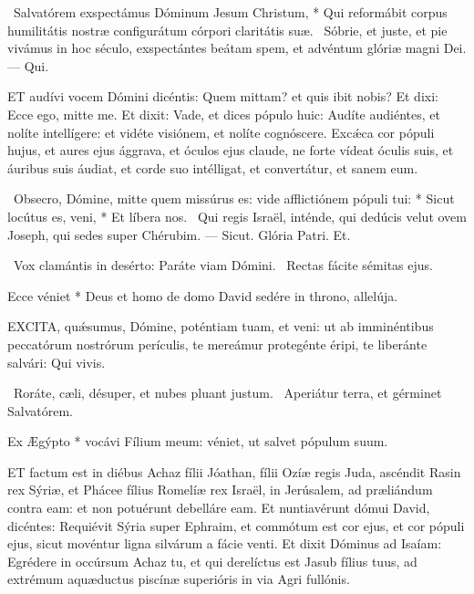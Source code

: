 \R\ Salvatórem exspectámus Dóminum Jesum Christum, * Qui reformábit corpus humilitátis nostræ configurátum córpori claritátis suæ. \V\ Sóbrie, et juste, et pie vivámus in hoc século, exspectántes beátam spem, et advéntum glóriæ magni Dei. --- Qui.


\lettrine[lines=2]{E}{T} audívi vocem Dómini dicéntis: Quem mittam? et quis ibit nobis? Et dixi: Ecce ego, mitte me. Et dixit: Vade, et dices pópulo huic: Audíte audiéntes, et nolíte intellígere: et vidéte visiónem, et nolíte cognóscere. Excǽca cor pópuli hujus, et aures ejus ággrava, et óculos ejus claude, ne forte vídeat óculis suis, et áuribus suis áudiat, et corde suo intélligat, et convertátur, et sanem eum.

\R\ Obsecro, Dómine, mitte quem missúrus es: vide afflictiónem pópuli tui: * Sicut locútus es, veni, * Et líbera nos. \V\ Qui regis Israël, inténde, qui dedúcis velut ovem Joseph, qui sedes super Chérubim. --- Sicut. Glória Patri. Et.

\V\ Vox clamántis in desérto: Paráte viam Dómini. \R\ Rectas fácite sémitas ejus.

 Ecce véniet * Deus et homo de domo David sedére in throno, allelúja.


\lettrine[lines=2]{E}{XCITA}, quǽsumus, Dómine, poténtiam tuam, et veni: ut ab imminéntibus peccatórum nostrórum perículis, te mereámur protegénte éripi, te liberánte salvári: Qui vivis.

\V\ Roráte, cæli, désuper, et nubes pluant justum. \R\ Aperiátur terra, et gérminet Salvatórem.

 Ex Ægýpto * vocávi Fílium meum: véniet, ut salvet pópulum suum.

\sectionornament




\lettrine[lines=2]{E}{T} factum est in diébus Achaz fílii Jóathan, fílii Ozíæ regis Juda, ascéndit Rasin rex Sýriæ, et Phácee fílius Romelíæ rex Israël, in Jerúsalem, ad præliándum contra eam: et non potuérunt debelláre eam. Et nuntiavérunt dómui David, dicéntes: Requiévit Sýria super Ephraim, et commótum est cor ejus, et cor pópuli ejus, sicut movéntur ligna silvárum a fácie venti. Et dixit Dóminus ad Isaíam: Egrédere in occúrsum Achaz tu, et qui derelíctus est Jasub fílius tuus, ad extrémum aquæductus piscínæ superióris in via Agri fullónis.

